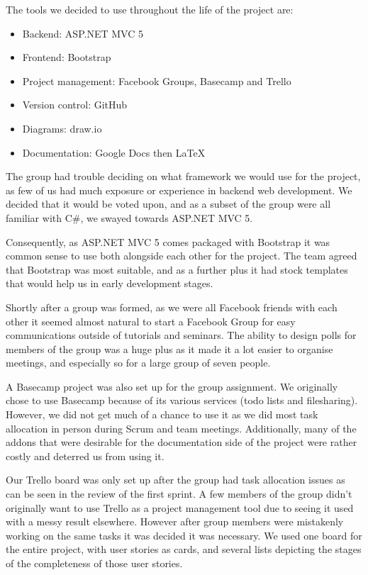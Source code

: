 \documentclass[a4paper,titlepage,12pt]{article}
\begin{document}
The tools we decided to use throughout the life of the project are:

\begin{itemize}
	\item Backend: ASP.NET MVC 5
	\item Frontend: Bootstrap
	\item Project management: Facebook Groups, Basecamp and Trello
	\item Version control: GitHub
	\item Diagrams: draw.io
	\item Documentation: Google Docs then \LaTeX
\end{itemize}

The group had trouble deciding on what framework we would use for the project,
as few of us had much exposure or experience in backend web development. We
decided that it would be voted upon, and as a subset of the group were all
familiar with C\#, we swayed towards ASP.NET MVC 5.

Consequently, as ASP.NET MVC 5 comes packaged with Bootstrap it was common
sense to use both alongside each other for the project. The team agreed that
Bootstrap was most suitable, and as a further plus it had stock templates that
would help us in early development stages.

Shortly after a group was formed, as we were all Facebook friends with each
other it seemed almost natural to start a Facebook Group for easy
communications outside of tutorials and seminars. The ability to design polls
for members of the group was a huge plus as it made it a lot easier to organise
meetings, and especially so for a large group of seven people.

A Basecamp project was also set up for the group assignment. We originally
chose to use Basecamp because of its various services (todo lists and
filesharing). However, we did not get much of a chance to use it as we did most
task allocation in person during Scrum and team meetings. Additionally, many of
the addons that were desirable for the documentation side of the project were
rather costly and deterred us from using it.

Our Trello board was only set up after the group had task allocation issues as
can be seen in the review of the first sprint. A few members of the group
didn't originally want to use Trello as a project management tool due to seeing
it used with a messy result elsewhere. However after group members were
mistakenly working on the same tasks it was decided it was necessary. We used
one board for the entire project, with user stories as cards, and several lists
depicting the stages of the completeness of those user stories.
\end{document}
